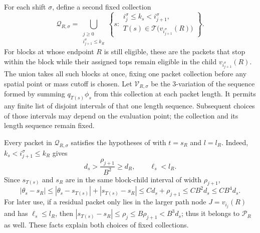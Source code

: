 For each shift $\sigma$, define a second fixed collection
\begin{equation}
 \mathcal Q_{R,\sigma}
 =\bigcup_{\substack{j\ge0\\ i_{j+1}^\sigma\le k_R}}
 \left\{s:
 \begin{array}{l}
 i_j^\sigma\le k_s<i_{j+1}^\sigma,\\
 T(s)\in\mathcal T\bigl(v_{i_{j+1}^\sigma}(R)\bigr)
 \end{array}\right\}.
 \label{hier:deterministic-residual-subset}
\end{equation}
For blocks at whose endpoint $R$ is still eligible, these are the packets
that stop within the block while their assigned tops remain eligible in
the child $v_{i_{j+1}^\sigma}(R)$.  The union takes all such blocks at
once, fixing one packet collection before any spatial point or mass cutoff
is chosen.  Let $\mathcal V_{R,\sigma}$ be the $3$-variation of the
sequence formed by summing $q_{T(s)}\phi_s$ from this collection at each
packet length.  It permits any finite list of disjoint intervals of that
one length sequence.  Subsequent choices of those intervals may depend
on the evaluation point; the collection and its length sequence remain fixed.

Every packet in $\mathcal Q_{R,\sigma}$ satisfies the hypotheses of
 with $t=s_R$ and $l=l_R$.  Indeed,
$k_s<i_{j+1}^\sigma\le k_R$ gives
\begin{equation}
 d_s>\frac{\rho_{j+1}}{B^2}\ge d_R,
 \qquad \ell_s<l_R.
 \label{hier:residual-precision}
\end{equation}
Since $s_{T(s)}$ and $s_R$ are in the same block-child interval of width
$\rho_{j+1}$,
\[
 |\theta_s-s_R|
 \le |\theta_s-s_{T(s)}|+|s_{T(s)}-s_R|
 \le C d_s+\rho_{j+1}\le C B^2d_s\le C B^4d_s.
\]
For later use, if a residual packet only lies in the larger path node
$J=v_{i_j}(R)$ and has $\ell_s\le l_R$, then
$|s_{T(s)}-s_R|\le\rho_j\le B\rho_{j+1}<B^3d_s$; thus it belongs to
$\mathcal P_R$ as well.  These facts explain both choices of fixed
collections.

